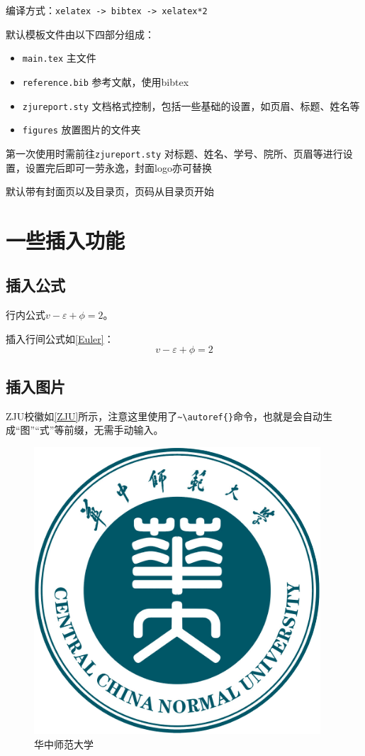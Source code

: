 \documentclass[12pt,hyperref,a4paper,UTF8]{ctexart}
\begin{document}
编译方式：\verb|xelatex -> bibtex -> xelatex*2|


默认模板文件由以下四部分组成：
\begin{itemize}
    \item \texttt{main.tex} 主文件
    \item \texttt{reference.bib} 参考文献，使用bibtex
    \item \texttt{zjureport.sty} 文档格式控制，包括一些基础的设置，如页眉、标题、姓名等
    \item \texttt{figures} 放置图片的文件夹
\end{itemize}

第一次使用时需前往\texttt{zjureport.sty} 对标题、姓名、学号、院所、页眉等进行设置，设置完后即可一劳永逸，封面logo亦可替换

默认带有封面页以及目录页，页码从目录页开始

\section{一些插入功能}
\subsection{插入公式}
行内公式$v-\varepsilon+\phi=2$。

插入行间公式如\autoref{Euler}：
\begin{equation}
    v-\varepsilon+\phi=2
    \label{Euler}
\end{equation}

\subsection{插入图片}
ZJU校徽如\autoref{ZJU}所示，注意这里使用了\verb|~\autoref{}|命令，也就是会自动生成“图”“式”等前缀，无需手动输入。

\begin{figure}[!htbp]
    \centering
    \includegraphics[width =.4\textwidth]{figures/ccnu_Logo_white.png}
    \caption{华中师范大学}
    \label{ZJU}
\end{figure}
\end{document}
